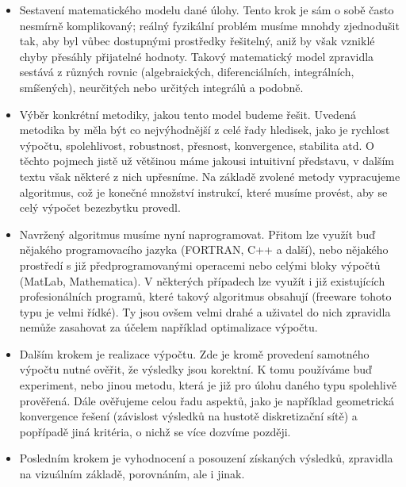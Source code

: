     \begin{itemize}
      \item Sestavení matematického modelu dané úlohy. Tento krok je sám o sobě často nesmírně
            komplikovaný; reálný fyzikální problém musíme mnohdy zjednodušit tak, aby byl vůbec
            dostupnými prostředky řešitel\-ný, aniž by však vzniklé chyby přesáhly přijatelné 
            hodnoty. Takový matematický model zpravidla sestává z různých rovnic (algebraických,
            diferenciálních, integrálních, smíšených), neurčitých nebo určitých integrálů a podobně.
      \item Výběr konkrétní metodiky, jakou tento model budeme řešit. Uvedená me\-to\-di\-ka by měla
            být co nejvýhodnější z celé řady hledisek, jako je rychlost výpočtu, spolehlivost,
            robustnost, přesnost, konvergence, stabilita atd. O těchto pojmech jistě už většinou 
            máme jakousi intuitivní představu, v dalším textu však některé z nich upřesníme. Na 
            základě zvolené metody vypracujeme algoritmus, což je konečné množství instrukcí, které 
            musíme provést, aby se celý výpočet bezezbytku provedl.
      \item Navržený algoritmus musíme nyní naprogramovat. Přitom lze využít buď nějakého
            programovacího jazyka (FORTRAN, C++ a další), nebo nějakého prostředí s již
            předprogramovanými operacemi nebo celými bloky výpočtů (MatLab, Mathematica). V 
            některých případech lze využít i již existujících profesionálních programů, které 
            takový algoritmus
            obsahují (freeware tohoto typu je velmi řídké). Ty jsou ovšem velmi drahé a uživatel do
            nich zpravidla nemůže zasahovat za účelem například optimalizace výpočtu.
      \item Dalším krokem je realizace výpočtu. Zde je kromě provedení samotného výpočtu nutné
            ověřit, že výsledky jsou korektní. K tomu používáme buď experiment, nebo jinou metodu,
            která je již pro úlohu daného typu spolehlivě prověřená. Dále ověřujeme celou řadu
            aspektů, jako je například geometrická konvergence řešení (závislost výsledků na hustotě
            diskretizační sítě) a popřípadě jiná kritéria, o nichž se více dozvíme později.
      \item Posledním krokem je vyhodnocení a posouzení získaných výsledků, zpravidla na vizuálním
            základě, porovnáním, ale i jinak.
    \end{itemize}
  
